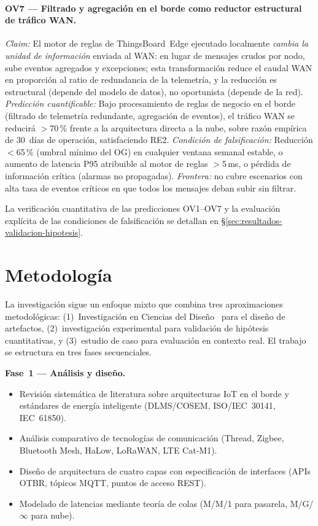 \paragraph{OV7 --- Filtrado y agregación en el borde como reductor estructural de tráfico WAN.}
\emph{Claim:} El motor de reglas de ThingsBoard~Edge ejecutado localmente \emph{cambia la unidad de información} enviada al WAN: en lugar de mensajes crudos por nodo, sube eventos agregados y excepciones; esta transformación reduce el caudal WAN en proporción al ratio de redundancia de la telemetría, y la reducción es estructural (depende del modelo de datos), no oportunista (depende de la red).
\emph{Predicción cuantificable:} Bajo procesamiento de reglas de negocio en el borde (filtrado de telemetría redundante, agregación de eventos), el tráfico WAN se reducirá $>$70\,\% frente a la arquitectura directa a la nube, sobre razón empírica de 30~días de operación, satisfaciendo RE2.
\emph{Condición de falsificación:} Reducción $<$65\,\% (umbral mínimo del OG) en cualquier ventana semanal estable, o aumento de latencia P95 atribuible al motor de reglas $>$5\,ms, o pérdida de información crítica (alarmas no propagadas). \emph{Frontera:} no cubre escenarios con alta tasa de eventos críticos en que todos los mensajes deban subir sin filtrar.

La verificación cuantitativa de las predicciones OV1--OV7 y la evaluación explícita de las condiciones de falsificación se detallan en §\ref{sec:resultados-validacion-hipotesis}.


\section{Metodología}

La investigación sigue un enfoque mixto que combina tres aproximaciones metodológicas: (1)~Investigación en Ciencias del Diseño~\cite{hevnerDesignScienceInformation2004,peffersDesignScienceResearch2007} para el diseño de artefactos, (2)~investigación experimental para validación de hipótesis cuantitativas, y (3)~estudio de caso para evaluación en contexto real. El trabajo se estructura en tres fases secuenciales.


\textbf{Fase~1 --- Análisis y diseño.}
\begin{itemize}
    \item Revisión sistemática de literatura sobre arquitecturas IoT en el borde y estándares de energía inteligente (DLMS/COSEM, ISO/IEC~30141, IEC~61850).
    \item Análisis comparativo de tecnologías de comunicación (Thread, Zigbee, Bluetooth Mesh, HaLow, LoRaWAN, LTE Cat-M1).
    \item Diseño de arquitectura de cuatro capas con especificación de interfaces (APIs OTBR, tópicos MQTT, puntos de acceso REST).
    \item Modelado de latencias mediante teoría de colas (M/M/1 para pasarela, M/G/$\infty$ para nube).
\end{itemize}



